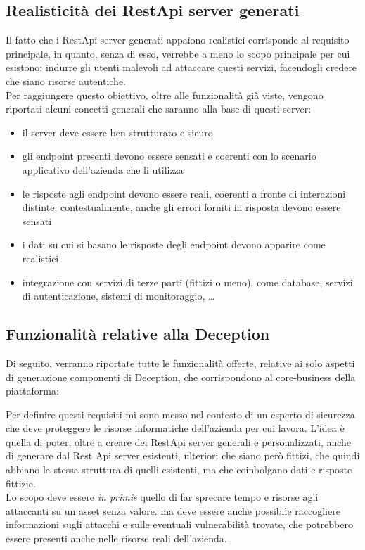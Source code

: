\subsection{Realisticità dei RestApi server generati}
Il fatto che i RestApi server generati appaiono realistici corrisponde al requisito principale, in quanto, senza di esso, verrebbe a meno lo scopo principale per cui esistono: indurre gli utenti malevoli ad attaccare questi servizi, facendogli credere che siano risorse autentiche.\\
Per raggiungere questo obiettivo, oltre alle funzionalità già viste, vengono riportati alcuni concetti generali che saranno alla base di questi server:
\begin{itemize}
    \item il server deve essere ben strutturato e sicuro
    \item gli endpoint presenti devono essere sensati e coerenti con lo scenario applicativo dell'azienda che li utilizza
    \item le risposte agli endpoint devono essere reali, coerenti a fronte di interazioni distinte; contestualmente, anche gli errori forniti in risposta devono essere sensati
    \item i dati su cui si basano le risposte degli endpoint devono apparire come realistici
    \item integrazione con servizi di terze parti (fittizi o meno), come database, servizi di autenticazione, sistemi di monitoraggio, \dots
\end{itemize}

\subsection{Funzionalità relative alla Deception}
Di seguito, verranno riportate tutte le funzionalità offerte, relative ai solo aspetti di generazione componenti di Deception, che corrispondono al core-business della piattaforma:

\noindent Per definire questi requisiti mi sono messo nel contesto di un esperto di sicurezza che deve proteggere le risorse informatiche dell'azienda per cui lavora.
L'idea è quella di poter, oltre a creare dei RestApi server generali e personalizzati, anche di generare dal Rest Api server esistenti, ulteriori che siano però fittizi, che quindi abbiano la stessa struttura di quelli esistenti, ma che coinbolgano dati e risposte fittizie.\\
Lo scopo deve essere \textit{in primis} quello di far sprecare tempo e risorse agli attaccanti su un asset senza valore. ma deve essere anche possibile raccogliere informazioni sugli attacchi e sulle eventuali vulnerabilità trovate, che potrebbero essere presenti anche nelle risorse reali dell'azienda.

